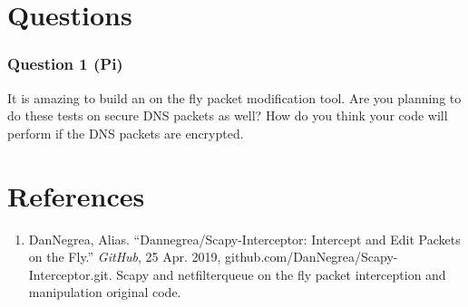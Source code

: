 \documentclass{article}
\begin{document}
\section{Questions}
\subsubsection{Question 1 (Pi)}
It is amazing to build an on the fly packet modification tool. Are you planning to do these tests on secure DNS packets as well? How do you think your code will perform if the DNS packets are encrypted.

\section{References}
\begin{enumerate}
    \item[] DanNegrea, Alias. “Dannegrea/Scapy-Interceptor: Intercept and Edit Packets on the Fly.” \textit{GitHub}, 25 Apr. 2019, github.com/DanNegrea/Scapy-Interceptor.git. Scapy and netfilterqueue on the fly packet interception and manipulation original code.
\end{enumerate}
\end{document}
